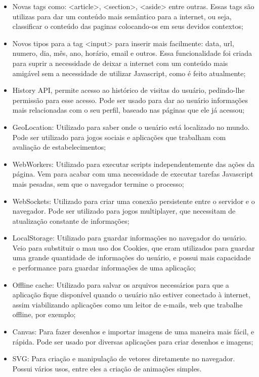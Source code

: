 \begin{itemize}
  \item Novas tags como: <article>, <section>, <aside> entre outras.
  Essas tags são utilizas para dar um conteúdo mais semântico para a
  internet, ou seja, classificar o conteúdo das paginas colocando-os
  em seus devidos contextos;
  \item Novos tipos para a tag <input> para inserir mais facilmente:
  data, url, numero, dia, mês, ano, horário, email e outros. Essa
  funcionalidade foi criada para suprir a necessidade de deixar a
  internet com um conteúdo mais amigável sem a necessidade de utilizar
  Javascript, como é feito atualmente;
  \item History API, permite acesso ao histórico de visitas do usuário,
  pedindo-lhe permissão para esse acesso. Pode ser usado para dar ao
  usuário informações mais relacionadas com o seu perfil, baseado nas
  páginas que ele já acessou;
  \item GeoLocation: Utilizado para saber onde o usuário está localizado no
  mundo. Pode ser utilizado para jogos sociais e aplicações que
  trabalham com avaliação de estabelecimentos;
  \item WebWorkers: Utilizado para executar scripts independentemente das ações
  da página. Vem para acabar com uma necessidade de executar tarefas
  Javascript mais pesadas, sem que o navegador termine o processo;
  \item WebSockets: Utilizado para criar uma conexão persistente entre
  o servidor e o navegador. Pode ser utilizado para jogos multiplayer,
  que necessitam de atualização constante de informações;
  \item LocalStorage: Utilizado para guardar informações no navegador
  do usuário. Veio para substituir o mau uso dos Cookies, que eram
  utilizados para guardar uma grande quantidade de informações do
  usuário, e possui mais capacidade e performance para guardar
  informações de uma aplicação;
  \item Offline cache: Utilizado para salvar os arquivos necessários
  para que a aplicação fique disponível quando o usuário não estiver
  conectado à internet, assim viabilizando aplicações como um leitor
  de e-mails, web que trabalhe offline, por exemplo;
  \item Canvas: Para fazer desenhos e importar imagens de uma maneira
  mais fácil, e rápida. Pode ser usado por diversas aplicações para criar desenhos e
  imagens;
  \item SVG: Para criação e manipulação de vetores diretamente no
  navegador. Possui vários usos, entre eles a criação de animações
  simples.
\end{itemize}

